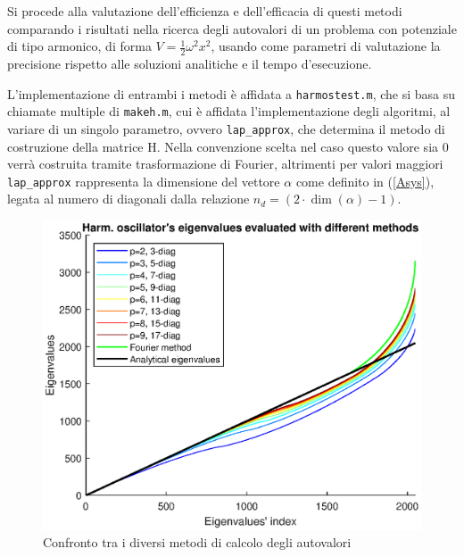 \documentclass[a4paper,11pt,twoside,twocolumn]{article}
\begin{document}
Si procede alla valutazione dell'efficienza e dell'efficacia di questi metodi comparando i risultati nella ricerca degli autovalori di un problema con potenziale di tipo armonico, di forma \(V=\frac{1}{2}\omega^2 x^2\), usando come parametri di valutazione la precisione rispetto alle soluzioni analitiche e il tempo d'esecuzione.

L'implementazione di entrambi i metodi è affidata a \verb|harmostest.m|, che si basa su chiamate multiple di \verb|makeh.m|, cui è affidata l'implementazione degli algoritmi, al variare di un singolo parametro, ovvero \verb|lap_approx|, che determina il metodo di costruzione della matrice H. Nella convenzione scelta nel caso questo valore sia 0 verrà costruita tramite trasformazione di Fourier, altrimenti per valori maggiori \verb|lap_approx| rappresenta la dimensione del vettore \(\alpha\) come definito in (\ref{Asys}), legata al numero di diagonali dalla relazione \(n_d=(2 \cdot \dim(\alpha)-1)\).

\begin{figure}
    \centering
    \includegraphics[width=1.0\columnwidth]{heig}
    \caption{Confronto tra i diversi metodi di calcolo degli autovalori}
    \label{heig}
\end{figure}
\end{document}
